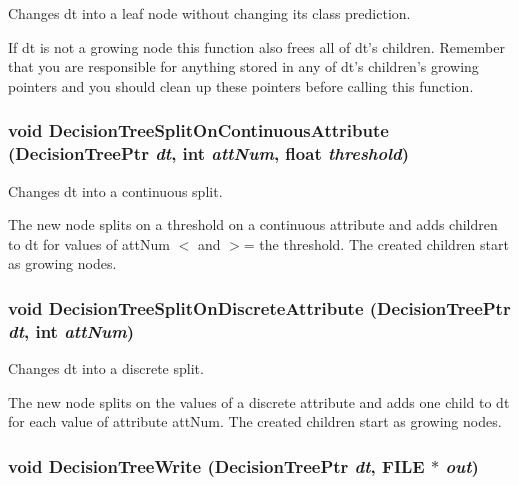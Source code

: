 Changes dt into a leaf node without changing its class prediction. 

If dt is not a growing node this function also frees all of dt's children. Remember that you are responsible for anything stored in any of dt's children's growing pointers and you should clean up these pointers before calling this function. 
\subsubsection{\setlength{\rightskip}{0pt plus 5cm}void Decision\-Tree\-Split\-On\-Continuous\-Attribute ({\bf Decision\-Tree\-Ptr} {\em dt}, int {\em att\-Num}, float {\em threshold})}\label{DecisionTree_8h_a22}


Changes dt into a continuous split. 

The new node splits on a threshold on a continuous attribute and adds children to dt for values of att\-Num $<$ and $>$= the threshold. The created children start as growing nodes. 
\subsubsection{\setlength{\rightskip}{0pt plus 5cm}void Decision\-Tree\-Split\-On\-Discrete\-Attribute ({\bf Decision\-Tree\-Ptr} {\em dt}, int {\em att\-Num})}\label{DecisionTree_8h_a21}


Changes dt into a discrete split. 

The new node splits on the values of a discrete attribute and adds one child to dt for each value of attribute att\-Num. The created children start as growing nodes. 
\subsubsection{\setlength{\rightskip}{0pt plus 5cm}void Decision\-Tree\-Write ({\bf Decision\-Tree\-Ptr} {\em dt}, FILE $\ast$ {\em out})}\label{DecisionTree_8h_a38}


